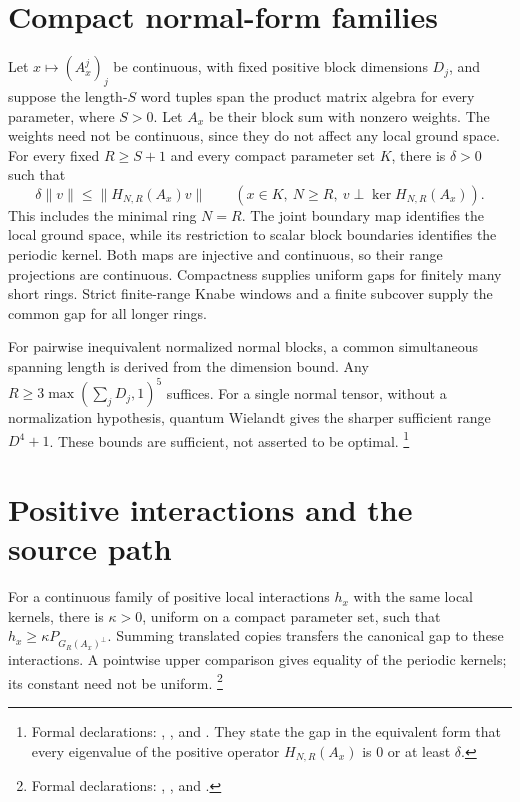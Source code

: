 \documentclass{article}
\begin{document}
\section{Compact normal-form families}
Let $x\mapsto(A_x^j)_j$ be continuous, with fixed positive block dimensions
$D_j$, and suppose the length-$S$ word tuples span the product matrix algebra
for every parameter, where $S>0$. Let $A_x$ be their block sum with nonzero
weights. The weights need not be continuous, since they do not affect any
local ground space. For every fixed $R\geq S+1$ and every compact parameter
set $K$, there is $\delta>0$ such that
\[
    \delta\lVert v\rVert\leq\lVert H_{N,R}(A_x)v\rVert
    \qquad(x\in K,\ N\geq R,\ v\perp\ker H_{N,R}(A_x)).
\]
This includes the minimal ring $N=R$. The joint boundary map identifies the
local ground space, while its restriction to scalar block boundaries
identifies the periodic kernel. Both maps are injective and continuous, so
their range projections are continuous. Compactness supplies uniform gaps
for finitely many short rings. Strict finite-range Knabe windows and a finite
subcover supply the common gap for all longer rings.

For pairwise inequivalent normalized normal blocks, a common simultaneous
spanning length is derived from the dimension bound. Any
$R\geq3\max(\sum_jD_j,1)^5$ suffices. For a single normal tensor, without a
normalization hypothesis, quantum Wielandt gives the sharper sufficient
range $D^4+1$. These bounds are sufficient, not asserted to be optimal.
\footnote{Formal declarations:
    ,
    , and
    .
    They state the gap in the equivalent form that every eigenvalue of the
    positive operator $H_{N,R}(A_x)$ is $0$ or at least $\delta$.}

\section{Positive interactions and the source path}
For a continuous family of positive local interactions $h_x$ with the same
local kernels, there is $\kappa>0$, uniform on a compact parameter set, such
that $h_x\geq\kappa P_{G_R(A_x)^\perp}$. Summing translated copies transfers
the canonical gap to these interactions. A pointwise upper comparison gives
equality of the periodic kernels; its constant need not be uniform.
\footnote{Formal declarations:
    ,
    , and
    .}
\end{document}
